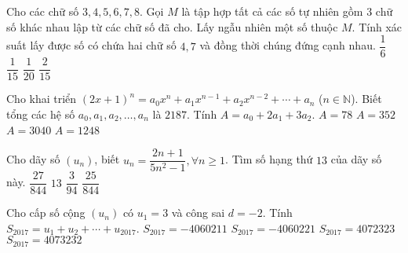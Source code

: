 \begin{ex}%
	Cho các chữ số $3, 4, 5, 6, 7, 8$. Gọi $M$ là tập hợp tất cả các số tự nhiên gồm $3$ chữ số khác nhau lập từ các chữ số đã cho. Lấy ngẫu nhiên một số thuộc $M$. Tính xác suất lấy được số có chứa hai chữ số $4, 7$ và đồng thời chúng đứng cạnh nhau.
	\choice
	{$\dfrac{1}{6}$}
	{$\dfrac{1}{15}$}
	{$\dfrac{1}{20}$}
	{\True $\dfrac{2}{15}$}
\end{ex}

\begin{ex}%
	Cho khai triển $(2x+1)^n=a_0x^n+a_1x^{n-1}+a_2x^{n-2}+\cdots+a_n$ ($n\in\mathbb{N}$). Biết tổng các hệ số $a_0, a_1, a_2, \ldots ,a_n$ là $2187$. Tính $A=a_0+2a_1+3a_2$.
	\choice
	{$A=78$}
	{$A=352$}
	{\True $A=3040$}
	{$A=1248$}
\end{ex}

\begin{ex}%
	Cho dãy số $(u_n)$, biết  $u_n=\dfrac{2n+1}{5n^2-1}, \forall n\ge 1$. Tìm số hạng thứ $13$ của dãy số này.
	\choice
	{\True $\dfrac{27}{844}$}
	{$13$}
	{$\dfrac{3}{94}$}
	{$\dfrac{25}{844}$}
\end{ex}

\begin{ex}%
	Cho cấp số cộng $(u_n)$ có $u_1=3$ và công sai $d=-2$. Tính $S_{2017}=u_1+u_2+\cdots +u_{2017}$.
	\choice
	{$S_{2017}=-4060211$}
	{\True $S_{2017}=-4060221$}
	{$S_{2017}=4072323$}
	{$S_{2017}=4073232$}
\end{ex}

